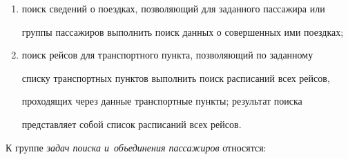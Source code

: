 \begin{enumerate}[(1)]
\item поиск сведений о поездках, позволяющий для заданного пассажира или 


группы пассажиров выполнить поиск данных о совершенных ими поездках;


\item поиск рейсов для транспортного пункта, позволяющий по заданному 


списку транспортных пунктов выполнить поиск расписаний всех рейсов, 


проходящих через данные транспортные пункты; результат поиска 


представляет собой список расписаний всех рейсов.


\end{enumerate}


      


 К группе \textit{задач поиска и~объединения пассажиров} относятся:


